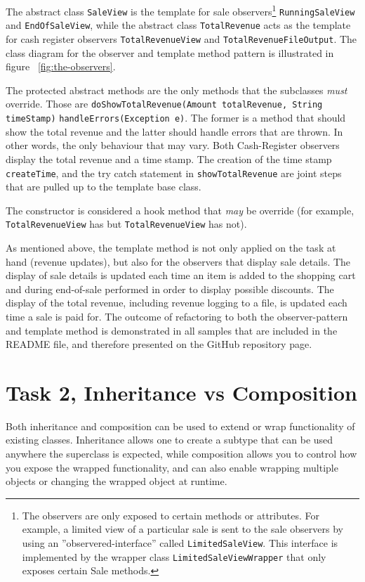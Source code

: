 \documentclass[a4paper]{scrreprt}
\begin{document}
The abstract class
\texttt{SaleView} is the template
for sale observers\footnote{The observers are only exposed to certain methods or attributes.
For example, a limited view of a particular sale is sent to the
sale observers by using an ''observered-interface'' called
\texttt{LimitedSaleView}.
This interface is implemented by the wrapper class
\texttt{LimitedSaleViewWrapper} that
only exposes certain Sale methods.}
\texttt{RunningSaleView} and
\texttt{EndOfSaleView},
while the abstract class
\texttt{TotalRevenue}
acts as the template for cash register observers
\texttt{TotalRevenueView} and
\texttt{TotalRevenueFileOutput}.
The class diagram for the observer and template method pattern
is illustrated in figure ~\ref{fig:the-observers}.

The protected abstract methods are the only methods that the subclasses \emph{must} override.
Those are
\texttt{doShowTotalRevenue(Amount totalRevenue, String timeStamp)}
\texttt{handleErrors(Exception e)}.
The former is a method that should show the total revenue and the latter should handle errors that are thrown.
In other words, the only behaviour that may vary.
Both Cash-Register observers display the total revenue and a time stamp.
The creation of the time stamp
\texttt{createTime}, and the try catch statement in
\texttt{showTotalRevenue} are joint steps
that are pulled up to the template base class.

The constructor is considered a hook method that \emph{may} be override
(for example, \texttt{TotalRevenueView} has but
\texttt{TotalRevenueView} has not).

As mentioned above, the template method
is not only applied on the task at hand (revenue updates),
but also for the observers that display sale details.
The display of sale details is updated each time an item is added to the shopping cart
and during end-of-sale performed in order to display possible discounts.
The display of the total revenue, including revenue logging to a file, is updated
each time a sale is paid for.
The outcome of refactoring to both the observer-pattern and template method
is demonstrated in all samples that are included in the README file,
and therefore presented on the GitHub repository page.

\section*{Task 2, Inheritance vs Composition}
Both inheritance and composition can be used to extend or wrap functionality
of existing classes.
Inheritance allows one to create a subtype
that can be used anywhere the superclass is expected,
while composition allows you to control how you expose the wrapped functionality,
and can also enable wrapping multiple objects or changing the wrapped object at runtime.
\end{document}
